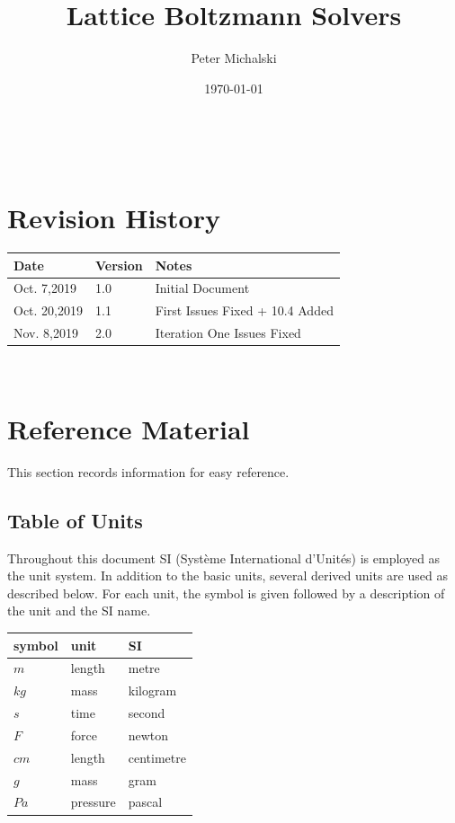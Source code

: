 \documentclass[12pt]{article}
\newcommand{\famname}{Lattice Boltzmann Solvers} %
\begin{document}
\title{\famname} 
\author{Peter Michalski}
\date{\today}

\maketitle

~\newpage


\section{Revision History}

\begin{tabularx}{\textwidth}{p{3cm}p{2cm}X}
\toprule {\bf Date} & {\bf Version} & {\bf Notes}\\
\midrule
Oct. 7,2019 & 1.0 & Initial Document\\
Oct. 20,2019 & 1.1 & First Issues Fixed + 10.4 Added\\
Nov. 8,2019 & 2.0 & Iteration One Issues Fixed\\
\bottomrule
\end{tabularx}

~\newpage
	
\section{Reference Material}

This section records information for easy reference.

\subsection{Table of Units}

Throughout this document SI (Syst\`{e}me International d'Unit\'{e}s) is employed
as the unit system.  In addition to the basic units, several derived units are
used as described below.  For each unit, the symbol is given followed by a
description of the unit and the SI name.
~\newline

\renewcommand{\arraystretch}{1.2}
  \noindent \begin{tabular}{l l l} 
    \toprule		
    \textbf{symbol} & \textbf{unit} & \textbf{SI}\\
    \midrule 
    $m$ & length & metre\\
    $kg$ & mass	& kilogram\\
    $s$ & time & second\\
    $F$ & force & newton\\
    $cm$ & length & centimetre\\
    $g$ & mass & gram \\
    $Pa$ & pressure & pascal\\
    \bottomrule
  \end{tabular}
\end{document}
